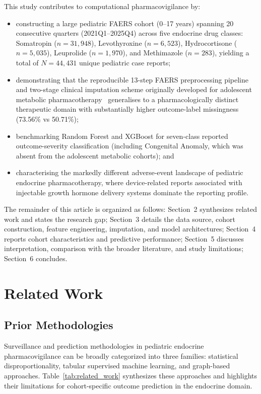 \documentclass[10pt,twocolumn]{article}
\newcommand{\FAERS}{\textsf{FAERS}\xspace}
\begin{document}
This study contributes to computational pharmacovigilance by:
\begin{itemize}[leftmargin=*]
\item constructing a large pediatric \FAERS cohort (0--17 years) spanning 20 consecutive quarters (2021Q1--2025Q4) across five endocrine drug classes: Somatropin ($n = 31{,}948$), Levothyroxine ($n = 6{,}523$), Hydrocortisone ($n = 5{,}035$), Leuprolide ($n = 1{,}970$), and Methimazole ($n = 283$), yielding a total of $N = 44{,}431$ unique pediatric case reports;
\item demonstrating that the reproducible 13-step \FAERS preprocessing pipeline and two-stage clinical imputation scheme originally developed for adolescent metabolic pharmacotherapy~\cite{telkar2026obesity} generalises to a pharmacologically distinct therapeutic domain with substantially higher outcome-label missingness (73.56\% vs 50.71\%);
\item benchmarking Random Forest and XGBoost for seven-class reported outcome-severity classification (including Congenital Anomaly, which was absent from the adolescent metabolic cohorts); and
\item characterising the markedly different adverse-event landscape of pediatric endocrine pharmacotherapy, where device-related reports associated with injectable growth hormone delivery systems dominate the reporting profile.
\end{itemize}
 
The remainder of this article is organized as follows: Section~2 synthesizes related work and states the research gap; Section~3 details the data source, cohort construction, feature engineering, imputation, and model architectures; Section~4 reports cohort characteristics and predictive performance; Section~5 discusses interpretation, comparison with the broader literature, and study limitations; Section~6 concludes.
 
\section{Related Work}
 
\subsection{Prior Methodologies}
Surveillance and prediction methodologies in pediatric endocrine pharmacovigilance can be broadly categorized into three families: statistical disproportionality, tabular supervised machine learning, and graph-based approaches. Table~\ref{tab:related_work} synthesizes these approaches and highlights their limitations for cohort-specific outcome prediction in the endocrine domain.
 
\end{document}
